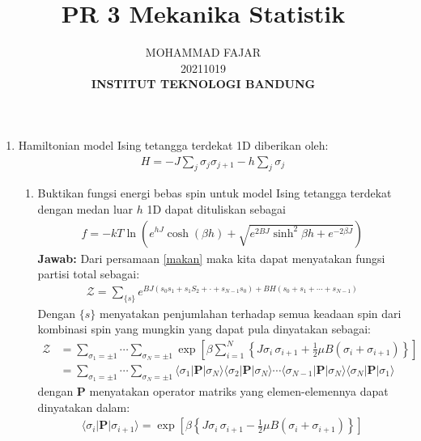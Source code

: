\documentclass[a4paper , 12pt, cc]{article}
\title{PR 3 Mekanika Statistik}
\author{MOHAMMAD FAJAR\\
20211019\\
\textbf{INSTITUT TEKNOLOGI BANDUNG}}
\begin{document}
\maketitle

\begin{enumerate}
\item \label{nomor 1} Hamiltonian model Ising tetangga terdekat 1D diberikan oleh:
\begin{align}
H = - J \sum_j \sigma_j \sigma_{j +1}  - h \sum_j \sigma_j 
\end{align}
\begin{enumerate}
\item  Buktikan fungsi energi bebas spin untuk model Ising tetangga terdekat dengan medan luar $h$ 1D dapat dituliskan sebagai  \label{makan}
\begin{align} 
f = - kT \ln \left( e^{hJ} \cosh (\beta h) + \sqrt{ e^{2 BJ} \sinh^2 \beta h + e^{-2\beta J}}\right)
\end{align}
\textbf{Jawab:} \newline
Dari persamaan \ref{makan} maka kita dapat menyatakan fungsi partisi total sebagai:
\begin{align}
\mathcal{Z} = \sum_{\{s\}} e^{BJ (s_0s_1 + s_1 S_2 + \cdot + s_{N - 1}s_0) + BH (s_0 + s_1 + \cdots + s_{N -1})} 
\end{align}
Dengan $\{s\}$ menyatakan penjumlahan terhadap semua keadaan spin dari kombinasi spin yang mungkin yang dapat pula dinyatakan sebagai:
\begin{align}
\mathcal{Z} & = \sum_{\sigma_1 = \pm 1} \cdots \sum_{\sigma_N = \pm 1}
 \exp 
 \left[
  \beta  \sum_{i = 1}^{N} 
  \left\{ 
  J \sigma_i \, \sigma_{i + 1} + \frac{1}{2} \mu B (\sigma_i + \sigma_{i +1})
  \right\} 
  \right] \nonumber \\
  & =  \sum_{\sigma_1 = \pm 1} \cdots \sum_{\sigma_N = \pm 1}  \langle \sigma_1 \lvert \boldsymbol{P} \lvert \sigma_N \rangle   \langle \sigma_2 \lvert \boldsymbol{P} \lvert \sigma_N \rangle \cdots   \langle \sigma_{N - 1} \lvert \boldsymbol{P} \lvert \sigma_{N} \rangle   \langle \sigma_N \lvert \boldsymbol{P} \lvert \sigma_1 \rangle
\end{align}
dengan $\boldsymbol{P}$ menyatakan operator matriks yang elemen-elemennya dapat dinyatakan dalam:
\begin{align}
  \langle \sigma_i \lvert \boldsymbol{P} \lvert \sigma_{i +1} \rangle = \exp \left[ \beta \left\{ J \sigma_i \, \sigma_{i +1}  - \frac{1}{2} \mu B ( \sigma_i + \sigma_{i + 1})\right\}\right]
\end{align}

\end{enumerate}
\end{enumerate}
\end{document}
